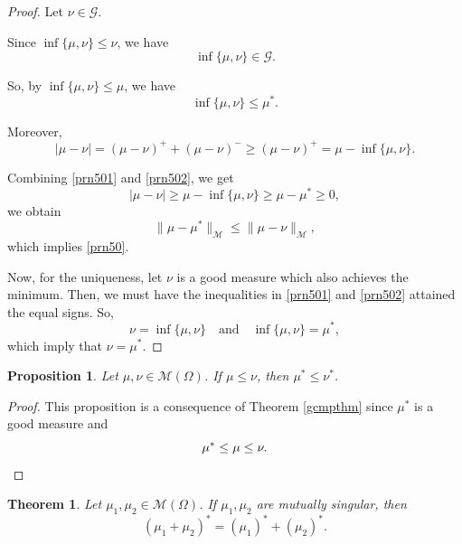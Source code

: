 \documentclass[a4paper, 11pt]{report}
\newtheorem{thm}{Theorem}[chapter]
\newtheorem{prn}{Proposition}[chapter]
\theoremstyle{definition}\newtheorem*{rmk}{Remark}
\begin{document}
\begin{proof}
Let $\nu \in\mathcal{G}$.

Since $\inf\{\mu,\nu\} \leq \nu$, we have 
\[
\inf\{\mu,\nu\} \in \mathcal{G}.
\]

So, by $\inf\{\mu,\nu\} \leq \mu$, we have
\begin{equation}\label{prn501}
\inf\{\mu,\nu\} \leq \mu^*.
\end{equation}

Moreover,
\begin{equation}\label{prn502}
|\mu - \nu| = (\mu - \nu)^+ + (\mu - \nu)^- \geq (\mu -\nu)^+ = \mu - \inf\{\mu,\nu\}.
\end{equation}

Combining \eqref{prn501} and \eqref{prn502}, we get
\[
|\mu - \nu| \ge \mu - \inf\{\mu,\nu\} \ge \mu -\mu^*  \geq 0,
\]
we obtain
\[
\| \mu - \mu^*\|_{\mathcal{M}} \le \| \mu - \nu \|_{\mathcal{M}},
\]
which implies \eqref{prn50}.

Now, for the uniqueness, let $\nu$ is a good measure which also achieves the minimum. Then, we must have the inequalities in \eqref{prn501} and \eqref{prn502} attained the equal signs. So,
\[
\nu = \inf\{\mu,\nu\}\quad\text{and}\quad \inf\{\mu,\nu\} = \mu^*,
\]
which imply that $\nu = \mu^*$.
\end{proof}

\begin{prn}\label{prn43}
Let $\mu, \nu \in \mathcal{M}(\Omega)$. If $\mu \le \nu$, then $\mu^* \le \nu^*$.
\end{prn}

\begin{proof}
This proposition is a consequence of Theorem \ref{gcmpthm} since $\mu^*$ is a good measure and
\[
\mu^* \leq \mu \leq \nu.\qedhere
\]
\end{proof}

\begin{thm}\label{thm47}
Let $\mu_1,\mu_2 \in \mathcal{M}(\Omega)$. If $\mu_1,\mu_2$ are mutually singular, then
\[
(\mu_1 + \mu_2)^* = (\mu_1)^* + (\mu_2)^*.
\]
\end{thm}
\end{document}
